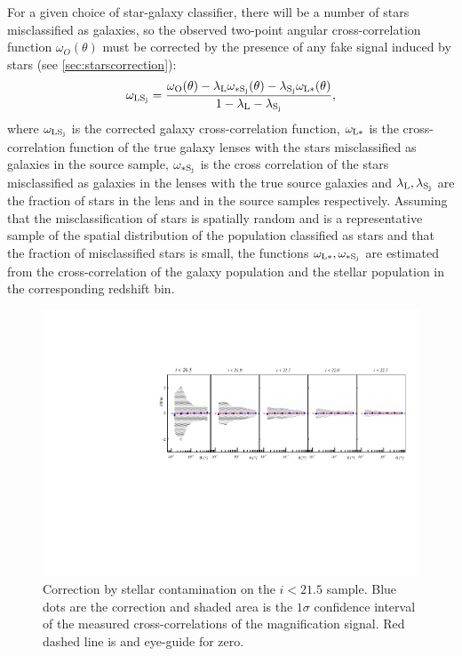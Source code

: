 	For a given choice of star-galaxy classifier, there will be a number of stars misclassified as galaxies, so the observed two-point angular cross-correlation function $\omega_O(\theta)$ must be corrected by the presence of any fake signal induced by stars (see \cref{sec:starscorrection}):
	\begin{equation}
	\omega_{\rm LS_j} = \frac{\omega_{\rm O}(\theta)-\lambda_{\rm L}\omega_{\rm *S_j}(\theta)-\lambda_{\rm S_j}\omega_{\rm L*}(\theta)}{1-\lambda_{\rm L}-\lambda_{\rm S_j}},
	\label{eq:starcorrection}
	\end{equation}
	where $\omega_{\rm LS_j}$ is the corrected galaxy cross-correlation function, $\omega_{\rm L*}$ is the cross-correlation function of the true galaxy lenses with the stars misclassified as galaxies in the source sample, $\omega_{\rm *S_j}$ is the cross correlation of the stars misclassified as galaxies in the lenses with the true source galaxies and $\lambda_{\rm L},\lambda_{\rm S_j}$ are the fraction of stars in the lens and in the source samples respectively.
	Assuming that the misclassification of stars is spatially random and is a representative sample of the spatial distribution of the population classified as stars and that the fraction of misclassified stars is small, the functions $\omega_{\rm L*},\omega_{\rm *S_j}$ are estimated from the cross-correlation of the galaxy population and the stellar population in the corresponding redshift bin.
    \begin{figure}
\includegraphics[width=\textwidth,trim={0 2.3cm 0 3.5cm},clip]{./figures/mag_istars.pdf}
\caption{Correction by stellar contamination on the $i<21.5$ sample. Blue dots are the correction and shaded area is the $1\sigma$ confidence interval of the measured cross-correlations of the magnification signal. Red dashed line is and eye-guide for zero.}
\label{fig:correction}
\end{figure}
\newline
 
